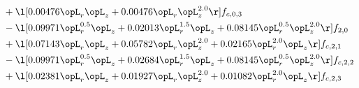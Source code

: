 \begin{alignat}{2}
& + \l[  0.00476 \opL_r \opL_z +  0.00476 \opL_r \opL_z^{2.0}  \r] f_{c,0,3} \nonumber \\ 
& - \l[  0.09971 \opL_r^{0.5} \opL_z +  0.02013 \opL_r^{1.5} \opL_z +  0.08145 \opL_r^{0.5} \opL_z^{2.0}  \r] f_{2,0} \nonumber \\ 
& + \l[  0.07143 \opL_r \opL_z +  0.05782 \opL_r \opL_z^{2.0} +  0.02165 \opL_r^{2.0} \opL_z  \r] f_{c,2,1} \nonumber \\ 
& - \l[  0.09971 \opL_r^{0.5} \opL_z +  0.02684 \opL_r^{1.5} \opL_z +  0.08145 \opL_r^{0.5} \opL_z^{2.0}  \r] f_{c,2,2} \nonumber \\ 
& + \l[  0.02381 \opL_r \opL_z +  0.01927 \opL_r \opL_z^{2.0} +  0.01082 \opL_r^{2.0} \opL_z  \r] f_{c,2,3} \nonumber \\ 
\end{alignat} 


